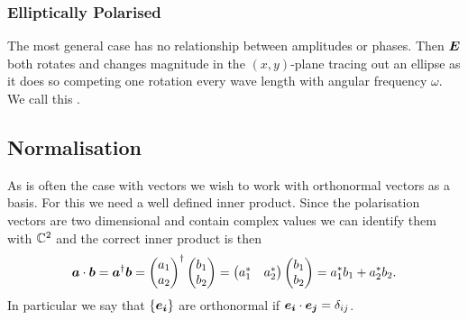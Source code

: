     \subsubsection{Elliptically Polarised}
    The most general case has no relationship between amplitudes or phases.
    Then \(\bm{E}\) both rotates and changes magnitude in the \((x, y)\)-plane tracing out an ellipse as it does so competing one rotation every wave length with angular frequency \(\omega\).
    We call this .
    
    \subsection{Normalisation}
    As is often the case with vectors we wish to work with orthonormal vectors as a basis.
    For this we need a well defined inner product.
    Since the polarisation vectors are two dimensional and contain complex values we can identify them with \(\mathbb{C}^2\) and the correct inner product is then
    \[
        \bm{a} \cdot \bm{b} = \bm{a}^\dagger\bm{b} =
        \begin{pmatrix}
            a_1\\ a_2
        \end{pmatrix}
        ^\dagger
        \begin{pmatrix}
            b_1\\ b_2
        \end{pmatrix}
        =
        \begin{pmatrix}
            a_1^* & a_2^*
        \end{pmatrix}
        \begin{pmatrix}
            b_1\\ b_2
        \end{pmatrix}
        = a_1^*b_1 + a_2^*b_2.
    \]
    In particular we say that \(\{\bm{e_{i}}\}\) are orthonormal if \(\bm{e_{i}}\cdot\bm{e_{j}} = \delta_{ij}\).
    
